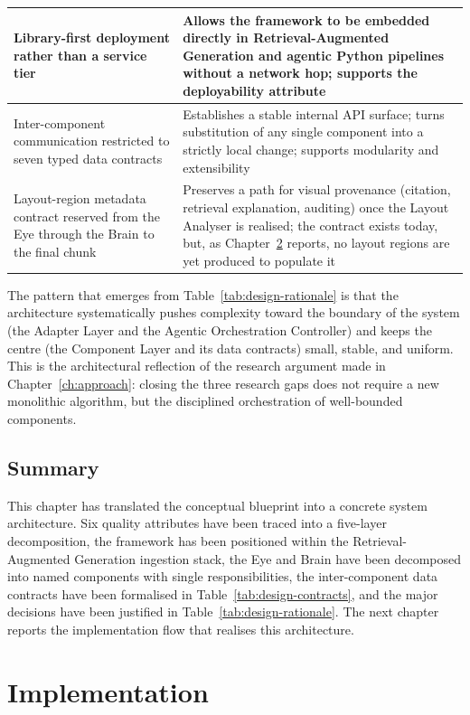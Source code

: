 \documentclass[12pt,a4paper,oneside]{report}
\begin{document}
\begin{table}[h]
\begin{tabularx}{\textwidth}{p{4.6cm} X}
\hline
Library-first deployment rather than a service tier & Allows the framework to be embedded directly in Retrieval-Augmented Generation and agentic Python pipelines without a network hop; supports the deployability attribute \\
\hline
Inter-component communication restricted to seven typed data contracts & Establishes a stable internal API surface; turns substitution of any single component into a strictly local change; supports modularity and extensibility \\
\hline
Layout-region metadata contract reserved from the Eye through the Brain to the final chunk & Preserves a path for visual provenance (citation, retrieval explanation, auditing) once the Layout Analyser is realised; the contract exists today, but, as Chapter~\ref{ch:implementation} reports, no layout regions are yet produced to populate it \\
\hline
\end{tabularx}
\end{table}

The pattern that emerges from Table~\ref{tab:design-rationale} is that the architecture systematically pushes complexity toward the boundary of the system (the Adapter Layer and the Agentic Orchestration Controller) and keeps the centre (the Component Layer and its data contracts) small, stable, and uniform. This is the architectural reflection of the research argument made in Chapter~\ref{ch:approach}: closing the three research gaps does not require a new monolithic algorithm, but the disciplined orchestration of well-bounded components.

\section{Summary}
\label{sec:ch5-summary}
This chapter has translated the conceptual blueprint into a concrete system architecture. Six quality attributes have been traced into a five-layer decomposition, the framework has been positioned within the Retrieval-Augmented Generation ingestion stack, the Eye and Brain have been decomposed into named components with single responsibilities, the inter-component data contracts have been formalised in Table~\ref{tab:design-contracts}, and the major decisions have been justified in Table~\ref{tab:design-rationale}. The next chapter reports the implementation flow that realises this architecture.

\chapter{Implementation}
\label{ch:implementation}
\end{document}
